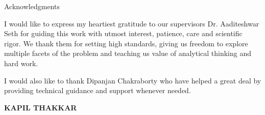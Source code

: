 \begin{center}
\LARGE{Acknowledgments} 
\end{center}

\vspace{0.5in}

I would like to express my heartiest gratitude to our supervisors Dr. Aaditeshwar Seth for guiding this work with utmost interest,
patience, care and scientific rigor. We thank them for setting high standards, giving us freedom to explore multiple facets of the problem and teaching us value of analytical thinking and hard work.

I would also like to thank Dipanjan Chakraborty who have helped a great deal by providing technical guidance and support whenever needed. 

\vspace{1.5in}

{\bfseries KAPIL THAKKAR}
